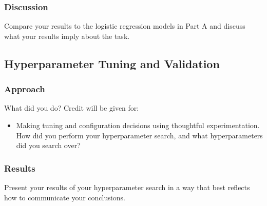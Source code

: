 \documentclass[11pt]{article}
\begin{document}
\subsubsection{Discussion}
Compare your results to the logistic regression models in Part A and discuss what your results imply about the task.


\subsection{Hyperparameter Tuning and Validation}

\subsubsection{Approach}
What did you do? Credit will be given for:

  \begin{itemize}
  \item Making tuning and configuration decisions using thoughtful experimentation.  
    How did you perform your hyperparameter search, and what hyperparameters did you search over?
  \end{itemize}

\subsubsection{Results}
Present your results of your hyperparameter search in a way that best reflects how to communicate your conclusions.
\end{document}
